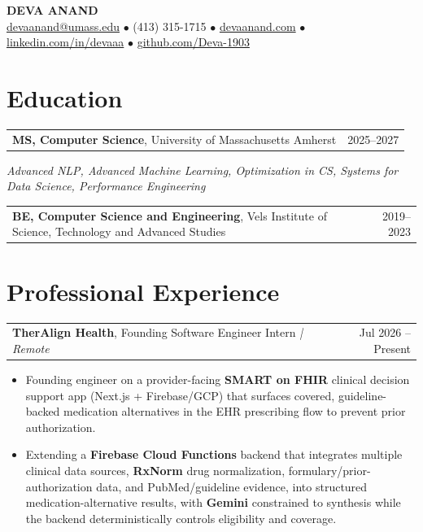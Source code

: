 \documentclass[letterpaper,11pt]{article}
\makeatletter
\newcommand{\eduItem}[3]{%
  \begin{tabular*}{\textwidth}{@{}l@{\extracolsep{\fill}}r@{}}
    \textbf{#1}, #2 & #3 \\
  \end{tabular*}\par
}
\newcommand{\expItem}[4]{%
  \vspace{2pt}
  \begin{tabular*}{\textwidth}{@{}l@{\extracolsep{\fill}}r@{}}
    \textbf{#1}, #2 \textit{| #3} & #4 \\
  \end{tabular*}\par\vspace{-3pt}
}
\makeatother
\begin{document}
\begin{center}
    {\fontsize{18}{20}\selectfont\bfseries DEVA ANAND}\\ \vspace{3pt}
    {\small
    \href{mailto:devaanand@umass.edu}{devaanand@umass.edu}
    \enspace$\bullet$\enspace
    (413) 315-1715
    \enspace$\bullet$\enspace
    \href{https://devaanand.com}{devaanand.com}
    \enspace$\bullet$\enspace
    \href{https://linkedin.com/in/devaaa/}{linkedin.com/in/devaaa}
    \enspace$\bullet$\enspace
    \href{https://github.com/Deva-1903}{github.com/Deva-1903}}
\end{center}
\vspace{-8pt}

\section{Education}
\eduItem{MS, Computer Science}{University of Massachusetts Amherst}{2025--2027}
{\small\textit{Advanced NLP, Advanced Machine Learning, Optimization in CS, Systems for Data Science, Performance Engineering}}\par
\vspace{3pt}
\eduItem{BE, Computer Science and Engineering}{Vels Institute of Science, Technology and Advanced Studies}{2019--2023}

\section{Professional Experience}

\expItem{TherAlign Health}{Founding Software Engineer Intern}{Remote}{Jul 2026 -- Present}
\begin{itemize}
  \item Founding engineer on a provider-facing \textbf{SMART on FHIR} clinical decision support app (Next.js + Firebase/GCP) that surfaces covered, guideline-backed medication alternatives in the EHR prescribing flow to prevent prior authorization.
  \item Extending a \textbf{Firebase Cloud Functions} backend that integrates multiple clinical data sources, \textbf{RxNorm} drug normalization, formulary/prior-authorization data, and PubMed/guideline evidence, into structured medication-alternative results, with \textbf{Gemini} constrained to synthesis while the backend deterministically controls eligibility and coverage.
\end{itemize}
\end{document}
